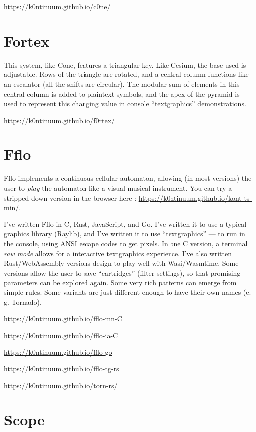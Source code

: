 \documentclass{article}
\renewcommand{\i}{\textit}
\newcommand{\q}{\enquote}
\begin{document}
{{\url{https://k0ntinuum.github.io/c0ne/}


\section*{Fortex}

This system, like Cone, features a triangular key. Like Cesium, the base used is adjustable. Rows of the triangle are rotated, and a central column functions like an escalator (all the shifts are circular). The modular sum of elements in this central column is added to plaintext symbols, and the apex of the pyramid is used to represent this changing value in console \q{textgraphics} demonstrations.

\url{https://k0ntinuum.github.io/f0rtex/}

  




\section*{Fflo}

Fflo implements a continuous cellular automaton, allowing (in most versions) the user to \i{play} the automaton like a visual-musical instrument. You can try a stripped-down version in the browser here : \url{https://k0ntinuum.github.io/kont-ts-min/}.  

I've written Fflo  in C, Rust, JavaScript, and Go. I've written it to use a typical graphics library (Raylib), and I've written it to use \q{textgraphics} --- to run in the console, using ANSI escape codes to get pixels. In one C version, a terminal \i{raw mode} allows for a interactive textgraphics experience. I've also written Rust/WebAssembly versions design to play well with Wasi/Wasmtime. Some versions allow the user to save \q{cartridges} (filter settings), so that promising parameters can be explored again. Some very rich patterns can emerge from simple rules. Some variants are just different enough to have their own names (e. g. Tornado).

\url{https://k0ntinuum.github.io/fflo-mn-C}

\url{https://k0ntinuum.github.io/fflo-ia-C}

\url{https://k0ntinuum.github.io/fflo-go}

\url{https://k0ntinuum.github.io/fflo-tg-rs}

\url{https://k0ntinuum.github.io/torn-rs/}

\section*{Scope}

}}
\end{document}

